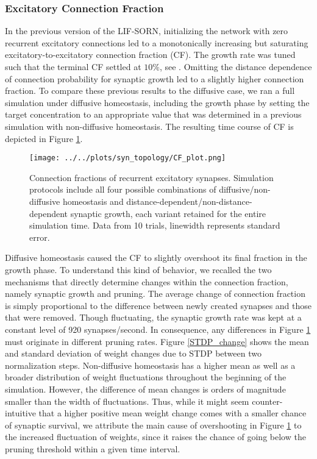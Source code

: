\documentclass[10pt,a4paper]{article}
\begin{document}
\subsubsection{Excitatory Connection Fraction}
In the previous version of the LIF-SORN, initializing the network with zero recurrent excitatory connections led to a monotonically increasing but saturating excitatory-to-excitatory connection fraction (CF). The growth rate was tuned such that the terminal CF settled at $\mathrm{10\%}$, see \cite[p. 8]{SORN_Paper}. Omitting the distance dependence of connection probability for synaptic growth led to a slightly higher connection fraction. To compare these previous results to the diffusive case, we ran a full simulation under diffusive homeostasis, including the growth phase by setting the target concentration to an appropriate value that was determined in a previous simulation with non-diffusive homeostasis. The resulting time course of CF is depicted in Figure \ref{CF_plot}.
\begin{figure}
\texttt{[image: ../../plots/syn\_topology/CF\_plot.png]}
\caption{Connection fractions of recurrent excitatory synapses. Simulation protocols include all four possible combinations of diffusive/non-diffusive homeostasis and distance-dependent/non-distance-dependent synaptic growth, each variant retained for the entire simulation time. Data from 10 trials, linewidth represents standard error.}
\label{CF_plot}
\end{figure}
Diffusive homeostasis caused the CF to slightly overshoot its final fraction in the growth phase. To understand this kind of behavior, we recalled the two mechanisms that directly determine changes within the connection fraction, namely synaptic growth and pruning. The average change of connection fraction is simply proportional to the difference between newly created synapses and those that were removed. Though fluctuating, the synaptic growth rate was kept at a constant level of 920 synapses/second. In consequence, any differences in Figure \ref{CF_plot} must originate in different pruning rates. Figure \ref{STDP_change} shows the mean and standard deviation of weight changes due to STDP between two normalization steps. Non-diffusive homeostasis has a higher mean as well as a broader distribution of weight fluctuations throughout the beginning of the simulation. However, the difference of mean changes is orders of magnitude smaller than the width of fluctuations. Thus, while it might seem counter-intuitive that a higher positive mean weight change comes with a smaller chance of synaptic survival, we attribute the main cause of overshooting in Figure \ref{CF_plot} to the increased fluctuation of weights, since it raises the chance of going below the pruning threshold within a given time interval.
\end{document}
